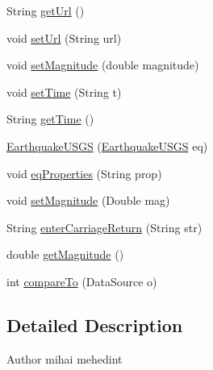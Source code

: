 \begin{DoxyCompactItemize}
\item 
String \mbox{\hyperlink{classbridges_1_1data__src__dependent_1_1_earthquake_u_s_g_s_a2af3938390c31096329e635510df437e}{get\+Url}} ()
\item 
void \mbox{\hyperlink{classbridges_1_1data__src__dependent_1_1_earthquake_u_s_g_s_aaa9d26333e7b80d0f72da58ea2ad41d1}{set\+Url}} (String url)
\item 
void \mbox{\hyperlink{classbridges_1_1data__src__dependent_1_1_earthquake_u_s_g_s_ad7902d80cbbe11046858db1f2792e99d}{set\+Magnitude}} (double magnitude)
\item 
void \mbox{\hyperlink{classbridges_1_1data__src__dependent_1_1_earthquake_u_s_g_s_ae3813930d3468eff007521f33c8e2139}{set\+Time}} (String t)
\item 
String \mbox{\hyperlink{classbridges_1_1data__src__dependent_1_1_earthquake_u_s_g_s_a03397a4410818546c5232f46a3d4ffc4}{get\+Time}} ()
\item 
\mbox{\hyperlink{classbridges_1_1data__src__dependent_1_1_earthquake_u_s_g_s_a6b9281a299d6e60736355eb8833f9e0d}{Earthquake\+U\+S\+GS}} (\mbox{\hyperlink{classbridges_1_1data__src__dependent_1_1_earthquake_u_s_g_s}{Earthquake\+U\+S\+GS}} eq)
\item 
void \mbox{\hyperlink{classbridges_1_1data__src__dependent_1_1_earthquake_u_s_g_s_acc0ba6890ee5963f88a399523f009ae4}{eq\+Properties}} (String prop)
\item 
void \mbox{\hyperlink{classbridges_1_1data__src__dependent_1_1_earthquake_u_s_g_s_a34a4c6ebe01c5daa7c86b3a4207d633f}{set\+Magnitude}} (Double mag)
\item 
String \mbox{\hyperlink{classbridges_1_1data__src__dependent_1_1_earthquake_u_s_g_s_aade0ce9a2fee927b015f5eb495c481e1}{enter\+Carriage\+Return}} (String str)
\item 
double \mbox{\hyperlink{classbridges_1_1data__src__dependent_1_1_earthquake_u_s_g_s_a3ec5d753277d6287b222448ff2477291}{get\+Magnitude}} ()
\item 
int \mbox{\hyperlink{classbridges_1_1data__src__dependent_1_1_earthquake_u_s_g_s_a60cad0a286825f77cd2900265acae982}{compare\+To}} (Data\+Source o)
\end{DoxyCompactItemize}


\subsection{Detailed Description}
\begin{DoxyAuthor}{Author}
mihai mehedint 
\end{DoxyAuthor}


